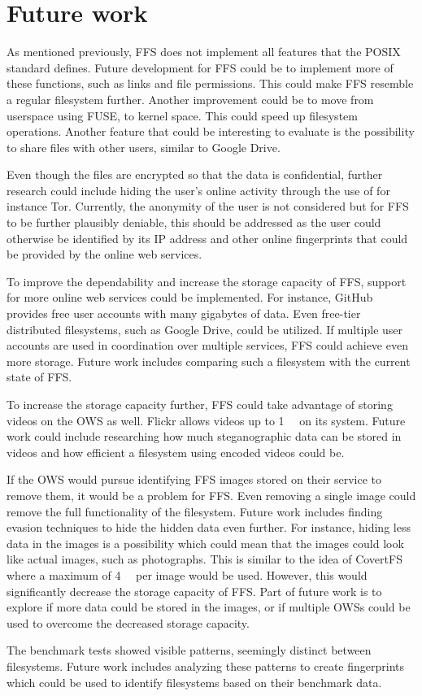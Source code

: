 
\section{Future work}
\label{sec:futureWork}

As mentioned previously, \gls{FFS} does not implement all features that the POSIX standard defines. Future development for \gls{FFS} could be to implement more of these functions, such as links and file permissions. This could make \gls{FFS} resemble a regular filesystem further. Another improvement could be to move from userspace using \gls{FUSE}, to kernel space. This could speed up filesystem operations. Another feature that could be interesting to evaluate is the possibility to share files with other users, similar to Google Drive.

Even though the files are encrypted so that the data is confidential, further research could include hiding the user's online activity through the use of for instance Tor. Currently, the anonymity of the user is not considered but for \gls{FFS} to be further plausibly deniable, this should be addressed as the user could otherwise be identified by its IP address and other online fingerprints that could be provided by the online web services.

To improve the dependability and increase the storage capacity of \gls{FFS}, support for more online web services could be implemented. For instance, GitHub provides free user accounts with many gigabytes of data. Even \mbox{free-tier} distributed filesystems, such as Google Drive, could be utilized. If multiple user accounts are used in coordination over multiple services, \gls{FFS} could achieve even more storage. Future work includes comparing such a filesystem with the current state of \gls{FFS}.

To increase the storage capacity further, \gls{FFS} could take advantage of storing videos on the \gls{OWS} as well. Flickr allows videos up to \SI[per-mode = symbol]{1}{\giga\byte} on its system. Future work could include researching how much steganographic data can be stored in videos and how efficient a filesystem using encoded videos could be.

If the \gls{OWS} would pursue identifying \gls{FFS} images stored on their service to remove them, it would be a problem for \gls{FFS}. Even removing a single image could remove the full functionality of the filesystem. Future work includes finding evasion techniques to hide the hidden data even further. For instance, hiding less data in the images is a possibility which could mean that the images could look like actual images, such as photographs. This is similar to the idea of CovertFS\,\cite{baliga2007web} where a maximum of \SI[per-mode = symbol]{4}{\kilo\byte} per image would be used. However, this would significantly decrease the storage capacity of \gls{FFS}. Part of future work is to explore if more data could be stored in the images, or if multiple \gls{OWS}s could be used to overcome the decreased storage capacity. 

The benchmark tests showed visible patterns, seemingly distinct between filesystems. Future work includes analyzing these patterns to create fingerprints which could be used to identify filesystems based on their benchmark data.

